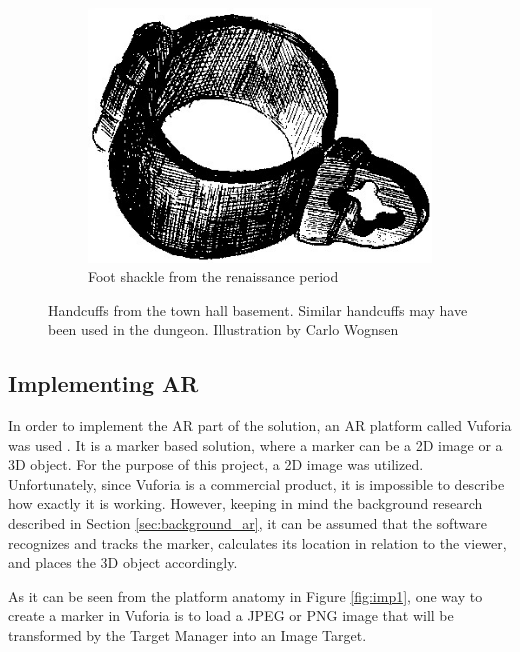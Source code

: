 \begin{figure}[h!]
\begin{subfigure}[h!]{0.3\textwidth}
        \includegraphics[width=\textwidth]{figures/chains2.jpg}
        \caption{Foot shackle from the renaissance period}\label{fig:chains2}
    \end{subfigure}
    \caption{Handcuffs from the town hall basement. Similar handcuffs may have been used in the dungeon. Illustration by Carlo Wognsen \cite{Riismoller1961}}\label{fig:chains}
\end{figure}

\subsection{Implementing AR}
In order to implement the AR part of the solution, an AR platform called Vuforia was used  \cite{Vuforia}. It is a marker based solution, where a marker can be a 2D image or a 3D object. For the purpose of this project, a 2D image was utilized. Unfortunately, since Vuforia is a commercial product, it is impossible to describe how exactly it is working. However, keeping in mind the background research described in Section \ref{sec:background_ar}, it can be assumed that the software recognizes and tracks the marker, calculates its location in relation to the viewer, and places the 3D object accordingly. 

As it can be seen from the platform anatomy in Figure \ref{fig:imp1}, one way to create a marker in Vuforia is to load a JPEG or PNG image that will be transformed by the Target Manager into an Image Target. 

